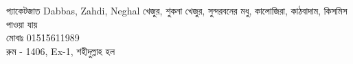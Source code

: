 \documentclass{article}
\begin{document}
\centering
{}
{{\fontsize{58}{66} \selectfont {}প্যাকেটজাত  Dabbas, Zahdi, Neghal  খেজুর, শুকনা খেজুর, সুন্দরবনের মধু, কালোজিরা, কাঠবাদাম, কিসমিস পাওয়া যায়\\}{\fontsize{50}{60}\selectfont মোবাঃ 01515611989\\  রুম - 1406, Ex-1, শহীদুল্লাহ হল\\}\vspace{1.4cm}}
\end{document}
